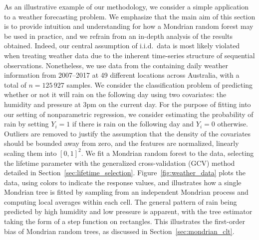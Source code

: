 As an illustrative example of our methodology, we consider a simple application
to a weather forecasting problem. We emphasize that the main aim of this
section is to provide intuition and understanding for how a Mondrian random
forest may be used in practice, and we refrain from an in-depth analysis of the
results obtained. Indeed, our central assumption of i.i.d.\ data is most likely
violated when treating weather data due to the inherent time-series structure
of sequential observations.
Nonetheless, we use data from the \cite{bomgovau} containing daily weather
information from 2007--2017 at 49 different locations across Australia, with a
total of $n = 125\,927$ samples. We consider the classification problem of
predicting whether or not it will rain on the following day using two
covariates: the humidity and pressure at 3pm on the current day.
For the purpose of fitting into our setting of nonparametric regression,
we consider estimating the probability of rain by setting
$Y_i = 1$ if there is rain on the following day and $Y_i = 0$ otherwise.
Outliers are removed to justify the assumption that the density of the
covariates
should be bounded away from zero, and the features are normalized, linearly
scaling
them into $[0,1]^2$. We fit a Mondrian
random forest to the data, selecting the lifetime parameter with the
generalized cross-validation (GCV)
method detailed in Section~\ref{sec:lifetime_selection}.
Figure~\ref{fig:weather_data} plots the
data, using colors to indicate the response values, and illustrates how a
single Mondrian tree is fitted by sampling from an independent Mondrian process
and computing local averages within each cell. The general pattern of rain
being predicted by high humidity and low pressure is apparent, with the tree
estimator taking the form of a step function on rectangles. This illustrates
the first-order bias of Mondrian random trees, as discussed in
Section~\ref{sec:mondrian_clt}.

